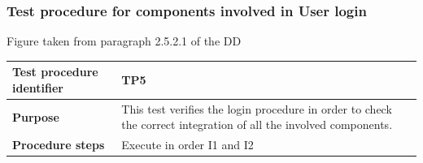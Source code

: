 \documentclass[a4paper,11pt]{report} %
\begin{document}
			\subsubsection{Test procedure for components involved in User login}
				\begin{minipage}{\linewidth}
				\end{minipage}
				\begin{center}
					Figure taken from paragraph 2.5.2.1 of the DD
				\end{center} 			
				\begin{center}
					\begin{tabular}{| l | p{9.5cm} |}\hline
						\textbf{Test procedure identifier} & TP5\\\hline
						\textbf{Purpose} & This test verifies the login procedure in order to check the correct integration of all the involved components.\\\hline
						\textbf{Procedure steps} & Execute in order I1 and I2 \\\hline
					\end{tabular}
				\end{center}
\end{document}
